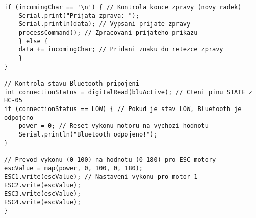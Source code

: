 \documentclass[12pt]{report}
\begin{document}
\begin{appendices}
\begin{lstlisting}[title={}, caption={}, label={}, basicstyle=\footnotesize\ttfamily, inputencoding=utf8]
	if (incomingChar == '\n') { // Kontrola konce zpravy (novy radek)
	Serial.print("Prijata zprava: ");
	Serial.println(data); // Vypsani prijate zpravy
	processCommand(); // Zpracovani prijateho prikazu
	} else {
	data += incomingChar; // Pridani znaku do retezce zpravy
	}
}

// Kontrola stavu Bluetooth pripojeni
int connectionStatus = digitalRead(bluActive); // Cteni pinu STATE z HC-05
if (connectionStatus == LOW) { // Pokud je stav LOW, Bluetooth je odpojeno
	power = 0; // Reset vykonu motoru na vychozi hodnotu
	Serial.println("Bluetooth odpojeno!");
}

// Prevod vykonu (0-100) na hodnotu (0-180) pro ESC motory
escValue = map(power, 0, 100, 0, 180); 
ESC1.write(escValue); // Nastaveni vykonu pro motor 1
ESC2.write(escValue);
ESC3.write(escValue);
ESC4.write(escValue);
}	
\end{lstlisting}  
\end{appendices}
\end{document}

